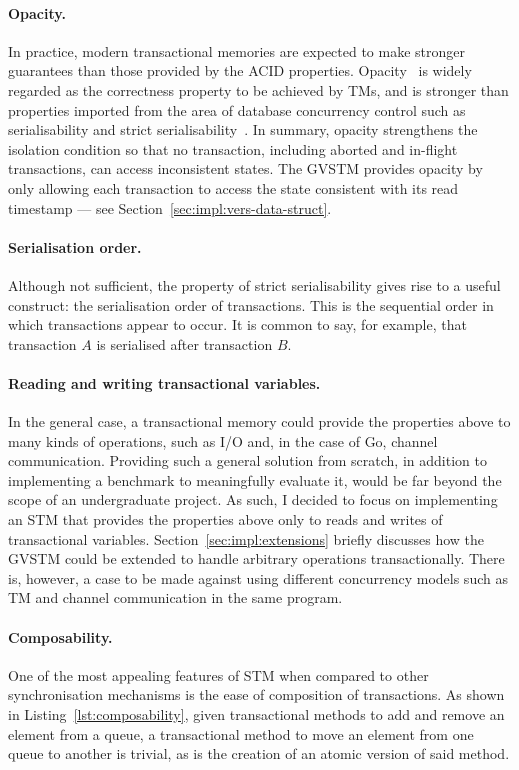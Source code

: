 \documentclass[12pt,a4paper,oneside,openright]{report}
\begin{document}
\paragraph{Opacity.} In practice, modern transactional memories are
expected to make stronger guarantees than those provided by the ACID
properties. Opacity~\cite{Opacity} is widely regarded as the
correctness property to be achieved by TMs, and is stronger than
properties imported from the area of database concurrency control such
as serialisability and strict
serialisability~\cite{Serialisability}. In summary, opacity
strengthens the isolation condition so that no transaction, including
aborted and in-flight transactions, can access inconsistent
states. The GVSTM provides opacity by only allowing each transaction
to access the state consistent with its read timestamp --- see
Section~\ref{sec:impl:vers-data-struct}.

\paragraph{Serialisation order.} Although not sufficient, the property
of strict serialisability gives rise to a useful construct: the
serialisation order of transactions. This is the sequential order in
which transactions appear to occur. It is common to say, for example,
that transaction $A$ is serialised after transaction $B$.

\paragraph{Reading and writing transactional variables.} In the
general case, a transactional memory could provide the properties
above to many kinds of operations, such as I/O and, in the case of Go,
channel communication. Providing such a general solution from scratch,
in addition to implementing a benchmark to meaningfully evaluate it,
would be far beyond the scope of an undergraduate project. As such, I
decided to focus on implementing an STM that provides the properties
above only to reads and writes of transactional
variables. Section~\ref{sec:impl:extensions} briefly discusses how the
GVSTM could be extended to handle arbitrary operations
transactionally. There is, however, a case to be made against using
different concurrency models such as TM and channel communication in
the same program.

\paragraph{Composability.} One of the most appealing features of STM
when compared to other synchronisation mechanisms is the ease of
composition of transactions. As shown in
Listing~\ref{lst:composability}, given transactional methods to add
and remove an element from a queue, a transactional method to move an
element from one queue to another is trivial, as is the creation of an
atomic version of said method.
\end{document}
